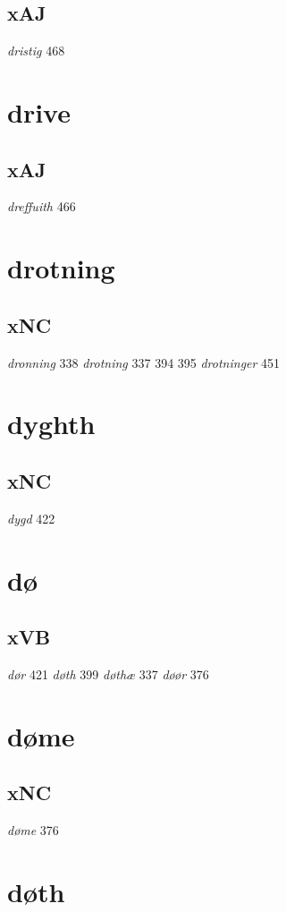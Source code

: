 \documentclass[a4paper,twocolumn]{article}
\begin{document}
\subsection{xAJ}
\label{sec:org29b59d0}
\emph{dristig} 468 
\section{drive}
\label{sec:orgb975481}
\subsection{xAJ}
\label{sec:org5cdd69b}
\emph{dreffuith} 466 
\section{drotning}
\label{sec:orgb5dc8b7}
\subsection{xNC}
\label{sec:orge581410}
\emph{dronning} 338 \emph{drotning} 337 394 395 \emph{drotninger} 451 
\section{dyghth}
\label{sec:org0507be8}
\subsection{xNC}
\label{sec:org816f282}
\emph{dygd} 422 
\section{dø}
\label{sec:orgf0f22d8}
\subsection{xVB}
\label{sec:orga4932b7}
\emph{dør} 421 \emph{døth} 399 \emph{døthæ} 337 \emph{døør} 376 
\section{døme}
\label{sec:org327800d}
\subsection{xNC}
\label{sec:orgb895b75}
\emph{døme} 376 
\section{døth}
\label{sec:orgcfa05ee}
\end{document}
